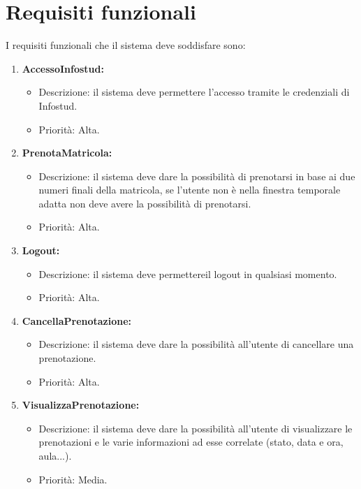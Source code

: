 \section{Requisiti funzionali}
I requisiti funzionali che il sistema deve soddisfare sono: 
\begin{enumerate}


\item \textbf{AccessoInfostud:}
\begin{itemize}
\item Descrizione: il sistema deve permettere l’accesso tramite le credenziali di Infostud.
\item	Priorità: Alta.
\end{itemize}


\item \textbf{PrenotaMatricola:}
\begin{itemize}
\item Descrizione: il sistema deve dare la possibilità di prenotarsi in base ai due numeri finali della matricola, se l’utente non è nella finestra temporale adatta non deve avere la possibilità di prenotarsi.
\item	Priorità: Alta.
\end{itemize}

\item \textbf{Logout:}
\begin{itemize}
\item Descrizione: il sistema deve permettereil logout in qualsiasi momento.
\item	Priorità: Alta.
\end{itemize}

\item \textbf{CancellaPrenotazione:}
\begin{itemize}
\item Descrizione: il sistema deve dare la possibilità all’utente di cancellare una prenotazione.
\item	Priorità: Alta.
\end{itemize}

\item \textbf{VisualizzaPrenotazione:}
\begin{itemize}
\item Descrizione: il sistema deve dare la possibilità all’utente di visualizzare le prenotazioni e le varie informazioni ad esse correlate (stato, data e ora, aula...).
\item	Priorità: Media.
\end{itemize}




\end{enumerate}
